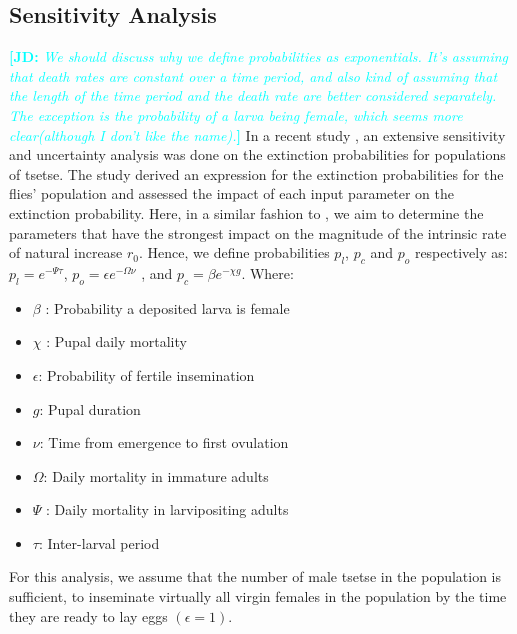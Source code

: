 \documentclass[12pt,a4paper]{article}
\newcommand{\comment}[3]{\textcolor{#1}{\textbf{[#2: }\textsl{#3}\textbf{]}}}
\newcommand{\jd}[1]{\comment{cyan}{JD}{#1}}
\begin{document}
\subsection*{Sensitivity Analysis}
\jd{We should discuss why we define probabilities as exponentials. It's assuming that death rates are constant over a time period, and also kind of assuming that the length of the time period and the death rate are better considered separately. The exception is the probability of a larva being female, which seems more clear(although I don't like the name).}
In a recent study \cite{are2019weakest}, an extensive sensitivity and uncertainty analysis was done on the extinction probabilities for populations of tsetse. The study derived an expression for the extinction probabilities for the flies' population and assessed the impact of each input parameter on the extinction probability. Here, in  a similar fashion to \cite{are2019weakest}, we aim to determine the parameters that have the strongest impact on the magnitude of the intrinsic rate of natural increase $r_0$. Hence, we define probabilities $p_l$, $p_c$ and $p_o$ respectively as: $p_l=e^{-\Psi \tau} $, $p_o =\epsilon e^{-\Omega \nu}$ , and $p_c =\beta e^{-\chi g}$.  Where: 
\begin{itemize}
	\item $\beta$ : Probability a deposited larva is female
	\item $\chi$ : Pupal daily mortality
	\item $\epsilon$: Probability of fertile insemination
	\item $g$: Pupal duration
	\item $\nu$: Time from emergence to first ovulation 
	\item $\Omega$: Daily mortality in immature adults 
	\item $\Psi$ : Daily mortality in larvipositing adults 
	\item $\tau$: Inter-larval period
\end{itemize}
For this analysis, we assume that the number of male tsetse in the population is sufficient, to inseminate virtually all virgin females in the population by the time they are ready to lay eggs $(\epsilon = 1)$. 
\end{document}

